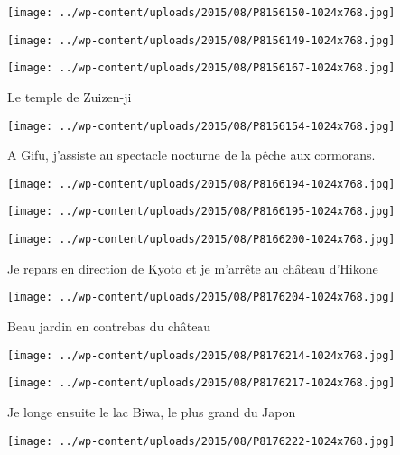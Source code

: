 \centerline{\texttt{[image: ../wp-content/uploads/2015/08/P8156150-1024x768.jpg]} } 
 \newline
 \newline
\centerline{\texttt{[image: ../wp-content/uploads/2015/08/P8156149-1024x768.jpg]} } 
 \newline
 \newline
\centerline{\texttt{[image: ../wp-content/uploads/2015/08/P8156167-1024x768.jpg]} } 
 \newline
 Le temple de Zuizen-ji \newline
 \newline
\centerline{\texttt{[image: ../wp-content/uploads/2015/08/P8156154-1024x768.jpg]} } 
 \newline
 A Gifu, j'assiste au spectacle nocturne de la pêche aux cormorans. \newline
 \newline
\centerline{\texttt{[image: ../wp-content/uploads/2015/08/P8166194-1024x768.jpg]} } 
 \newline
 \newline
\centerline{\texttt{[image: ../wp-content/uploads/2015/08/P8166195-1024x768.jpg]} } 
 \newline
 \newline
\centerline{\texttt{[image: ../wp-content/uploads/2015/08/P8166200-1024x768.jpg]} } 
 \newline
 Je repars en direction de Kyoto et je m'arrête au château d'Hikone \newline
 \newline
\centerline{\texttt{[image: ../wp-content/uploads/2015/08/P8176204-1024x768.jpg]} } 
 \newline
 Beau jardin en contrebas du château \newline
 \newline
\centerline{\texttt{[image: ../wp-content/uploads/2015/08/P8176214-1024x768.jpg]} } 
 \newline
 \newline
\centerline{\texttt{[image: ../wp-content/uploads/2015/08/P8176217-1024x768.jpg]} } 
 \newline
 Je longe ensuite le lac Biwa, le plus grand du Japon \newline
 \newline
\centerline{\texttt{[image: ../wp-content/uploads/2015/08/P8176222-1024x768.jpg]} } 
 \newline
